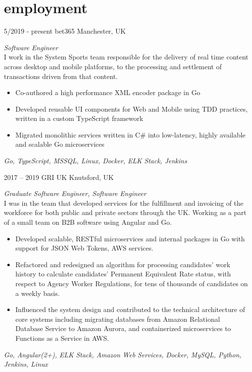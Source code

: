 \documentclass[]{friggeri-cv-a4} %
\begin{document}
\section{employment}
\begin{entrylist}

\entry
{5/2019 - present}
{bet365}
{Manchester, UK}
{\emph{Software Engineer} \\
I work in the System Sports team responsible for the delivery of real time content across desktop and mobile platforms, to the processing and settlement of transactions driven from that content.
\begin{itemize}
\item Co-authored a high performance XML encoder package in Go
\item Developed reusable UI components for Web and Mobile using TDD practices, written in a custom TypeScript framework
\item Migrated monolithic services written in C\# into low-latency, highly available and scalable Go microservices
\end{itemize}
\small{\textit{Go, TypeScript, MSSQL, Linux, Docker, ELK Stack, Jenkins}}
}

\entry
{2017 -- 2019}
{GRI UK}
{Knutsford, UK}
{\emph{Graduate Software Engineer, Software Engineer} \\
I was in the team that developed services for the fulfillment and invoicing of the workforce for both public and private sectors through the UK. Working as a part of a small team on B2B software using Angular and Go.
\begin{itemize}
\item Developed scalable, RESTful microservices and internal packages in Go with support for JSON Web Tokens, AWS services.
\item Refactored and redesigned an algorithm for processing candidates' work history to calculate candidates' Permanent Equivalent Rate status, with respect to Agency Worker Regulations, for tens of thousands of
candidates on a weekly basis.
\item Influenced the system design and contributed to the technical architecture of core systems including migrating databases from Amazon Relational Database Service to Amazon Aurora, and containerized microservices to Functions as a Service in AWS.
\end{itemize}
\small{\textit{Go, Angular(2+), ELK Stack, Amazon Web Services, Docker, MySQL, Python, Jenkins, Linux}}
}
\end{entrylist}
\end{document}
